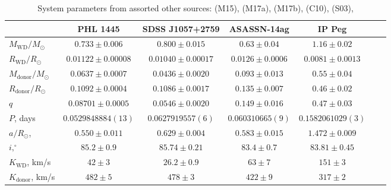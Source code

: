 \begin{landscape}
        \begin{table}
            \centering
            \caption{System parameters from assorted other sources: \citet{mcallister2015} (M15), \citet{mcallister2017} (M17a), \citet{mcallister2017b} (M17b), \citet{copperwheat2010} (C10), \citet{shafter2003} (S03), }
            \label{appendix:table:supplementary systems}
            \begin{tabular}{lcccccc}
                \hline
                ~                           & \textbf{PHL 1445}         & \textbf{SDSS J1057+2759}  & \textbf{ASASSN-14ag}  & \textbf{IP Peg}       \\
                \hline \hline
                $M_\mathrm{WD}/M_\odot$     & $0.733\pm0.006$           & $0.800\pm0.015$           & $0.63\pm0.04$         & $1.16\pm0.02$         \\
                $R_\mathrm{WD}/R_\odot$     & $0.01122\pm0.00008$       & $0.01040\pm0.00017$       & $0.0126\pm0.0006$     & $0.0081\pm0.0013$     \\
                $M_\mathrm{donor}/M_\odot$  & $0.0637\pm0.0007$         & $0.0436\pm0.0020$         & $0.093\pm0.013$       & $0.55\pm0.04$         \\
                $R_\mathrm{donor}/R_\odot$  & $0.1092\pm0.0004$         & $0.1086\pm0.0017$         & $0.135\pm0.007$       & $0.46\pm0.02$         \\
                $q$                         & $0.08701\pm0.0005$        & $0.0546\pm0.0020$         & $0.149\pm0.016$       & $0.47\pm0.03$         \\
                \hline
                $P$, days                   & $0.0529848884(13)$        & $0.0627919557(6)$         & $0.060310665(9)$      & $0.1582061029(3)$     \\
                $a/R_\odot$,                & $0.550\pm0.011$           & $0.629\pm0.004$           & $0.583\pm0.015$       & $1.472\pm0.009$       \\
                $i, ^\circ$                 & $85.2\pm0.9$              & $85.74\pm0.21$            & $83.4\pm0.7$          & $83.81\pm0.45$        \\
                $K_\mathrm{WD}$, km/s       & $42\pm3$                  & $26.2\pm0.9$              & $63\pm7$              & $151\pm3$             \\
                $K_\mathrm{donor}$, km/s    & $482\pm5$                 & $478\pm3$                 & $422\pm9$             & $317\pm2$             \\

\end{tabular}
\end{table}
\end{landscape}
